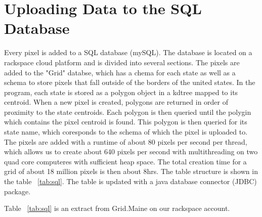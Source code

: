 \section{Uploading Data to the SQL Database}
Every pixel is added to a SQL database (mySQL). The database is located on a rackspace cloud platform and is divided into several sections.
The pixels are added to the "Grid" databse, which has a chema for each state as well as a schema to store pixels that fall outside of the borders of the united states.
In the program, each state is stored as a polygon object in a kdtree mapped to its centroid. When a new pixel is created, polygons are returned in order of proximity to the state centroids.
Each polygon is then queried until the polygin which contains the pixel centroid is found. This polygon is then queried for its state name, which coresponds to the schema of which the pixel is uploaded to.
The pixels are added with a runtime of about 80 pixels per second per thread, which allows us to create about 640 pixels per second with multithreading on two quad core computeres with sufficient heap space.
The total creation time for a grid of about 18 million pixels is then about 8hrs.
The table structure is shown in the table ~\ref{tab:sql}. The table is updated with a java database connector (JDBC) package.


\begin{table}[h]
\caption{SQL Table Structure}\label{tab:sql}
\begin{center}
\end{center}
\end{table}
Table ~\ref{tab:sql} is an extract from Grid.Maine on our rackspace account.

